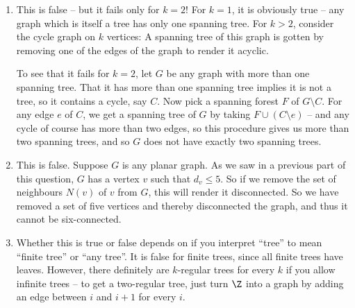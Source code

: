 \documentclass[nobib]{tufte-handout}
\begin{document}
\begin{enumerate}[label=\alph*)]
    \item This is false -- but it fails only for $k = 2$! For $k = 1$, it is obviously true -- any graph which is itself a tree has only one spanning tree. For $k > 2$, consider the cycle graph on $k$ vertices: A spanning tree of this graph is gotten by removing one of the edges of the graph to render it acyclic.
    
    To see that it fails for $k = 2$, let $G$ be any graph with more than one spanning tree. That it has more than one spanning tree implies it is not a tree, so it contains a cycle, say $C$. Now pick a spanning forest $F$ of $G \setminus C$. For any edge $e$ of $C$, we get a spanning tree of $G$ by taking $F \cup (C \setminus e)$ -- and any cycle of course has more than two edges, so this procedure gives us more than two spanning trees, and so $G$ does not have exactly two spanning trees.

    \item This is false. Suppose $G$ is any planar graph. As we saw in a previous part of this question, $G$ has a vertex $v$ such that $d_v \leq 5$. So if we remove the set of neighbours $N(v)$ of $v$ from $G$, this will render it disconnected. So we have removed a set of five vertices and thereby disconnected the graph, and thus it cannot be six-connected.
    
    \item Whether this is true or false depends on if you interpret ``tree'' to mean ``finite tree'' or ``any tree''. It is false for finite trees, since all finite trees have leaves. However, there definitely are $k$-regular trees for every $k$ if you allow infinite trees -- to get a two-regular tree, just turn $\Z$ into a graph by adding an edge between $i$ and $i+1$ for every $i$. 
\end{enumerate}
\end{document}
